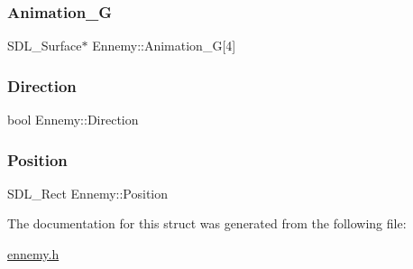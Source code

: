 \mbox{\label{structEnnemy_a8b4bb002eeade326a908f36f46763490}} 
\subsubsection{\texorpdfstring{Animation\+\_\+G}{Animation\_G}}
{\footnotesize\ttfamily S\+D\+L\+\_\+\+Surface$\ast$ Ennemy\+::\+Animation\+\_\+G\mbox{[}4\mbox{]}}

\mbox{\label{structEnnemy_ae145eac6d968735d00d6b0426b3f14f4}} 
\subsubsection{\texorpdfstring{Direction}{Direction}}
{\footnotesize\ttfamily bool Ennemy\+::\+Direction}

\mbox{\label{structEnnemy_a37ae489643736f036ddae15bc86d00d0}} 
\subsubsection{\texorpdfstring{Position}{Position}}
{\footnotesize\ttfamily S\+D\+L\+\_\+\+Rect Ennemy\+::\+Position}



The documentation for this struct was generated from the following file\+:\begin{DoxyCompactItemize}
\item 
\hyperlink{ennemy_8h}{ennemy.\+h}\end{DoxyCompactItemize}
